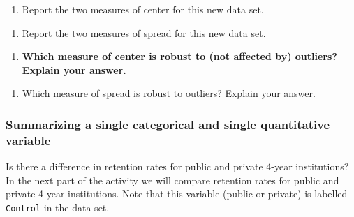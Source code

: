 \documentclass[
]{report}
\providecommand{\tightlist}{%
  \setlength{\itemsep}{0pt}\setlength{\parskip}{0pt}}
\begin{document}
\begin{enumerate}
\def\labelenumi{\arabic{enumi}.}
\setcounter{enumi}{9}
\tightlist
\item
  Report the two measures of center for this new data set.
\end{enumerate}

\vspace{0.8in}

\begin{enumerate}
\def\labelenumi{\arabic{enumi}.}
\setcounter{enumi}{10}
\tightlist
\item
  Report the two measures of spread for this new data set.
\end{enumerate}

\vspace{0.8in}

\begin{enumerate}
\def\labelenumi{\arabic{enumi}.}
\setcounter{enumi}{11}
\tightlist
\item
  \textbf{Which measure of center is robust to (not affected by) outliers? Explain your answer.}
\end{enumerate}

\vspace{0.5in}

\begin{enumerate}
\def\labelenumi{\arabic{enumi}.}
\setcounter{enumi}{12}
\tightlist
\item
  Which measure of spread is robust to outliers? Explain your answer.
\end{enumerate}

\vspace{0.5in}

\hypertarget{summarizing-a-single-categorical-and-single-quantitative-variable}{%
\subsubsection*{Summarizing a single categorical and single quantitative variable}\label{summarizing-a-single-categorical-and-single-quantitative-variable}}

Is there a difference in retention rates for public and private 4-year institutions? In the next part of the activity we will compare retention rates for public and private 4-year institutions. Note that this variable (public or private) is labelled \texttt{Control} in the data set.
\end{document}

